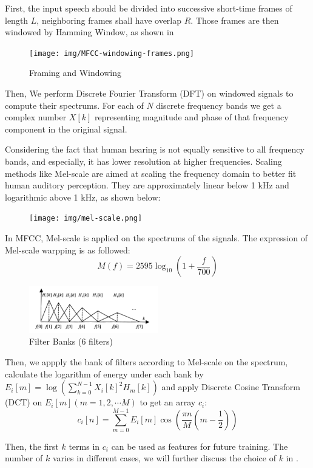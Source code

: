 First, the input speech should be divided into successive short-time frames of length $L$,
neighboring frames shall have overlap $R$.
Those frames are then windowed by Hamming Window, as shown in 
\begin{figure}[H]
  \centering
  \texttt{[image: img/MFCC-windowing-frames.png]}
  \caption{Framing and Windowing \label{fig:framming}}
\end{figure}

Then, We perform Discrete Fourier Transform (DFT) on windowed signals to compute their spectrums.
For each of $N$ discrete frequency bands we get a complex number $X[k]$ representing
magnitude and phase of that frequency component in the original signal.

Considering the fact that human hearing is not equally sensitive to all frequency bands, and especially,
it has lower resolution at higher frequencies.
Scaling methods like Mel-scale are aimed at scaling the frequency domain to better fit human auditory perception.
They are approximately linear below 1 kHz and logarithmic above 1 kHz, as shown below:
\begin{figure}[H]
  \centering
  \texttt{[image: img/mel-scale.png]}
\end{figure}

In MFCC, Mel-scale is applied on the spectrums of the signals.
The expression of Mel-scale warpping is as followed:
\[ M(f) = 2595 \log_{10}(1 + \dfrac{f}{700}) \]

\begin{figure}[H]
  \centering
  \includegraphics[width=0.5\textwidth]{img/bank.png}
  \caption{Filter Banks (6 filters) \label{fig:bank}}
\end{figure}
Then,  we appply the bank of filters according to Mel-scale on the spectrum,
calculate the logarithm of energy under each bank by $E_i[m] = \log (\sum_{k=0}^{N-1}{X_i[k]^2 H_m[k]}) $ and apply Discrete
Cosine Transform (DCT) on $E_i[m](m = 1, 2, \cdots M) $ to get an array $c_i $:
\[ c_i[n] = \sum_{m=0}^{M-1}{E_i[m]\cos(\dfrac{\pi n}{M}(m - \dfrac{1}{2}))} \]

Then, the first $k$ terms in $c_i $ can be used as features for future training.
The number of $k$ varies in different cases, we will further discuss the choice of $k$ in .


